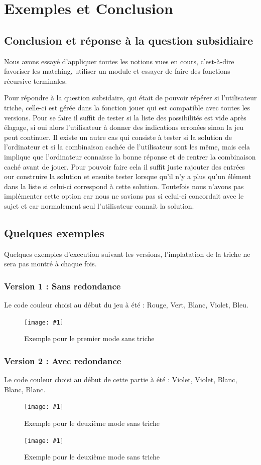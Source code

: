 \documentclass[a4paper,twoside,12pt]{report}
\newcommand{\monimage}[3]{
\par\noindent
\begin{figure}[H] %
\begin{center}
\texttt{[image: \#1]} %
\caption{#2} %
\label{#3} %
\end{center}
\end{figure} %
}
\begin{document}
\chapter{Exemples et Conclusion}
%
\section{Conclusion et réponse à la question subsidiaire}
\par Nous avons essayé d'appliquer toutes les notions vues en cours, c'est-à-dire favoriser les matching, utiliser un module et essayer de faire des fonctions récursive terminales.
\par Pour répondre à la question subsidaire, qui était de pouvoir répérer si l'utilisateur triche, celle-ci est gérée dans la fonction jouer qui est compatible avec toutes les versions. Pour se faire il suffit de tester si la liste des possibilités est vide après élagage, si oui alors l'utilisateur à donner des indications erronées sinon la jeu peut continuer. Il existe un autre cas qui consiste à tester si la solution de l'ordinateur et si la combinaison cachée de l'utilisateur sont les même, mais cela implique que l'ordinateur connaisse la bonne réponse et de rentrer la combinaison caché avant de jouer. Pour pouvoir faire cela il suffit juste rajouter des entrées our construire la solution et ensuite tester lorsque qu'il n'y a plus qu'un élément dans la liste si celui-ci correspond à cette solution. Toutefois nous n'avons pas implémenter cette option car nous ne savions pas si celui-ci concordait avec le sujet et car normalement seul l'utilisateur connait la solution.

\section{Quelques exemples}
Quelques exemples d'execution suivant les versions, l'implatation de la triche ne sera pas montré à chaque fois.

\subsection{Version 1 : Sans redondance}
Le code couleur choisi au début du jeu à été : Rouge, Vert, Blanc, Violet, Bleu.
\monimage{mode1sanstriche.png}{Exemple pour le premier mode sans triche}{M1ST}

\subsection{Version 2 : Avec redondance}

Le code couleur choisi au début de cette partie à été : Violet, Violet, Blanc, Blanc, Blanc.
\monimage{mode2sanstriche_1.png}{Exemple pour le deuxième mode sans triche}{M2ST}
\monimage{mode2sanstriche_2.png}{Exemple pour le deuxième mode sans triche}{M2ST}
\end{document}
